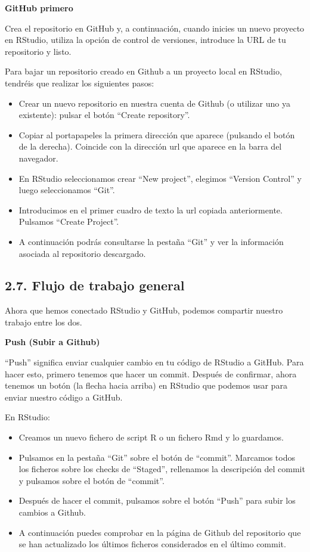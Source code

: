 \documentclass[
  letterpaper,
  DIV=11,
  numbers=noendperiod]{scrreprt}
\begin{document}
\textbf{GitHub primero}

Crea el repositorio en GitHub y, a continuación, cuando inicies un nuevo
proyecto en RStudio, utiliza la opción de control de versiones,
introduce la URL de tu repositorio y listo.

Para bajar un repositorio creado en Github a un proyecto local en
RStudio, tendréis que realizar los siguientes pasos:

\begin{itemize}
\item
  Crear un nuevo repositorio en nuestra cuenta de Github (o utilizar uno
  ya existente): pulsar el botón ``Create repository''.
\item
  Copiar al portapapeles la primera dirección que aparece (pulsando el
  botón de la derecha). Coincide con la dirección url que aparece en la
  barra del navegador.
\item
  En RStudio seleccionamos crear ``New project'', elegimos ``Version
  Control'' y luego seleccionamos ``Git''.
\item
  Introducimos en el primer cuadro de texto la url copiada
  anteriormente. Pulsamos ``Create Project''.
\item
  A continuación podrás consultarse la pestaña ``Git'' y ver la
  información asociada al repositorio descargado.
\end{itemize}

\hypertarget{flujo-de-trabajo-general}{%
\subsection{2.7. Flujo de trabajo
general}\label{flujo-de-trabajo-general}}

Ahora que hemos conectado RStudio y GitHub, podemos compartir nuestro
trabajo entre los dos.

\textbf{Push (Subir a Github)}

``Push'' significa enviar cualquier cambio en tu código de RStudio a
GitHub. Para hacer esto, primero tenemos que hacer un commit. Después de
confirmar, ahora tenemos un botón (la flecha hacia arriba) en RStudio
que podemos usar para enviar nuestro código a GitHub.

En RStudio:

\begin{itemize}
\item
  Creamos un nuevo fichero de script R o un fichero Rmd y lo guardamos.
\item
  Pulsamos en la pestaña ``Git'' sobre el botón de ``commit''. Marcamos
  todos los ficheros sobre los checks de ``Staged'', rellenamos la
  descripción del commit y pulsamos sobre el botón de ``commit''.
\item
  Después de hacer el commit, pulsamos sobre el botón ``Push'' para
  subir los cambios a Github.
\item
  A continuación puedes comprobar en la página de Github del repositorio
  que se han actualizado los últimos ficheros considerados en el último
  commit.
\end{itemize}
\end{document}
